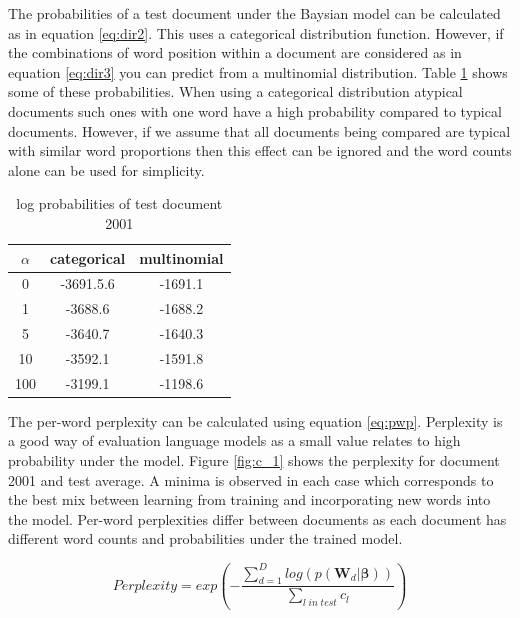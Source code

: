 \documentclass[twoside,twocolumn]{article}
\begin{document}
The probabilities of a test document under the Baysian model can be calculated as in equation \ref{eq:dir2}. This uses a categorical distribution function. However, if the combinations of word position within a document are considered as in equation \ref{eq:dir3} you can predict from a multinomial distribution. Table \ref{table:c1} shows some of these probabilities. When using a categorical distribution atypical documents such ones with one word have a high probability compared to typical documents. However, if we assume that all documents being compared are typical with similar word proportions then this effect can be ignored and the word counts alone can be used for simplicity.

\begin{table}[h]
\centering
\begin{tabular}{ c | c | c }
$\alpha$& categorical&multinomial\\ 

\midrule
0& -3691.5.6&-1691.1\\
1&-3688.6&-1688.2\\
5&-3640.7&-1640.3\\
10&-3592.1&-1591.8 \\
100&-3199.1&-1198.6\\
\end{tabular}
\caption{log probabilities of test document 2001}
\label{table:c1}
\end{table}


The per-word perplexity can be calculated using equation \ref{eq:pwp}. Perplexity is a good way of evaluation language models as a small value  relates to high probability under the model. Figure \ref{fig:c_1} shows the perplexity for document 2001 and test average. A minima is observed in each case which corresponds to the best mix between learning from training and incorporating new words into the model. Per-word perplexities differ between documents as each document has different word counts and probabilities under the trained model. 

\begin{equation}
Perplexity = exp ( - \frac{\sum_{d=1}^D log (p(\textbf{W}_{d}|\boldsymbol{\beta}))}{\sum_{l\; in \;test}c_l})
\label{eq:pwp}
\end{equation}
\end{document}
